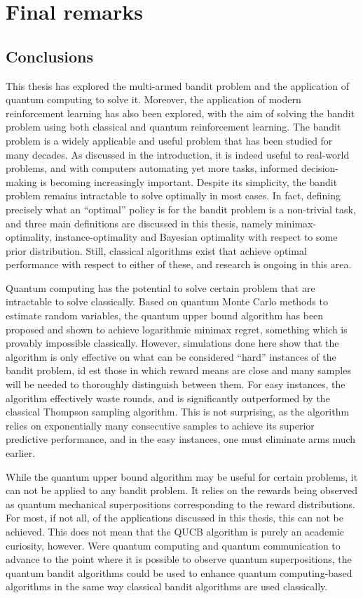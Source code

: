 \chapter{Final remarks}
\label{chap:final}

\section{Conclusions}
This thesis has explored the multi-armed bandit problem and the application of quantum computing to solve it.
Moreover, the application of modern reinforcement learning has also been explored, with the aim of solving the bandit problem using both classical and quantum reinforcement learning.
The bandit problem is a widely applicable and useful problem that has been studied for many decades.
As discussed in the introduction, it is indeed useful to real-world problems, and with computers automating yet more tasks, informed decision-making is becoming increasingly important.
Despite its simplicity, the bandit problem remains intractable to solve optimally in most cases.
In fact, defining precisely what an \enquote{optimal} policy is for the bandit problem is a non-trivial task, and three main definitions are discussed in this thesis, namely minimax-optimality, instance-optimality and Bayesian optimality with respect to some prior distribution.
Still, classical algorithms exist that achieve optimal performance with respect to either of these, and research is ongoing in this area.

Quantum computing has the potential to solve certain problem that are intractable to solve classically.
Based on quantum Monte Carlo methods to estimate random variables, the quantum upper bound algorithm has been proposed and shown to achieve logarithmic minimax regret, something which is provably impossible classically.
However, simulations done here show that the algorithm is only effective on what can be considered \enquote{hard} instances of the bandit problem, id est those in which reward means are close and many samples will be needed to thoroughly distinguish between them.
For easy instances, the algorithm effectively waste rounds, and is significantly outperformed by the classical Thompson sampling algorithm.
This is not surprising, as the algorithm relies on exponentially many consecutive samples to achieve its superior predictive performance, and in the easy instances, one must eliminate arms much earlier.

While the quantum upper bound algorithm may be useful for certain problems, it can not be applied to any bandit problem.
It relies on the rewards being observed as quantum mechanical superpositions corresponding to the reward distributions.
For most, if not all, of the applications discussed in this thesis, this can not be achieved.
This does not mean that the QUCB algorithm is purely an academic curiosity, however.
Were quantum computing and quantum communication to advance to the point where it is possible to observe quantum superpositions, the quantum bandit algorithms could be used to enhance quantum computing-based algorithms in the same way classical bandit algorithms are used classically.

